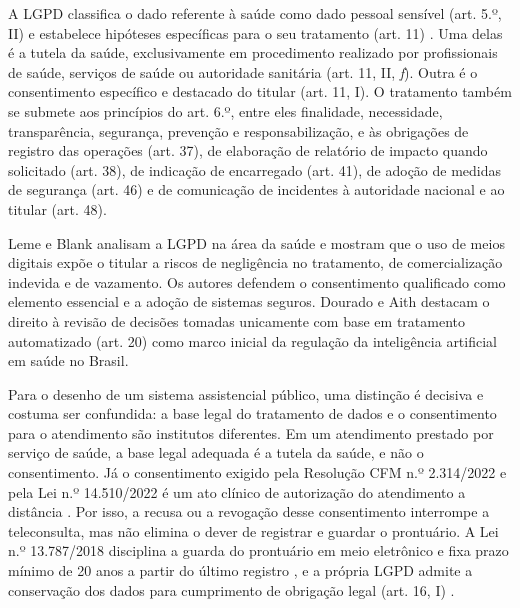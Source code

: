 
A LGPD classifica o dado referente à saúde como dado pessoal sensível (art. 5.º, II) e estabelece hipóteses específicas para o seu tratamento (art. 11) \cite{lgpd2018}. Uma delas é a tutela da saúde, exclusivamente em procedimento realizado por profissionais de saúde, serviços de saúde ou autoridade sanitária (art. 11, II, \textit{f}). Outra é o consentimento específico e destacado do titular (art. 11, I). O tratamento também se submete aos princípios do art. 6.º, entre eles finalidade, necessidade, transparência, segurança, prevenção e responsabilização, e às obrigações de registro das operações (art. 37), de elaboração de relatório de impacto quando solicitado (art. 38), de indicação de encarregado (art. 41), de adoção de medidas de segurança (art. 46) e de comunicação de incidentes à autoridade nacional e ao titular (art. 48).

Leme e Blank \cite{leme2020} analisam a LGPD na área da saúde e mostram que o uso de meios digitais expõe o titular a riscos de negligência no tratamento, de comercialização indevida e de vazamento. Os autores defendem o consentimento qualificado como elemento essencial e a adoção de sistemas seguros. Dourado e Aith \cite{dourado2022} destacam o direito à revisão de decisões tomadas unicamente com base em tratamento automatizado (art. 20) como marco inicial da regulação da inteligência artificial em saúde no Brasil.

Para o desenho de um sistema assistencial público, uma distinção é decisiva e costuma ser confundida: a base legal do tratamento de dados e o consentimento para o atendimento são institutos diferentes. Em um atendimento prestado por serviço de saúde, a base legal adequada é a tutela da saúde, e não o consentimento. Já o consentimento exigido pela Resolução CFM n.º 2.314/2022 e pela Lei n.º 14.510/2022 é um ato clínico de autorização do atendimento a distância \cite{cfm2314, lei14510}. Por isso, a recusa ou a revogação desse consentimento interrompe a teleconsulta, mas não elimina o dever de registrar e guardar o prontuário. A Lei n.º 13.787/2018 disciplina a guarda do prontuário em meio eletrônico e fixa prazo mínimo de 20 anos a partir do último registro \cite{lei13787}, e a própria LGPD admite a conservação dos dados para cumprimento de obrigação legal (art. 16, I) \cite{lgpd2018}.



